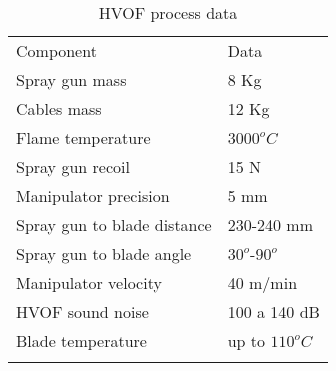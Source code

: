 
\begin{table}
\caption{HVOF process data}
\label{tab::hvof}

\begin{tabular}{ll}
\hline\noalign{\smallskip}
Component & Data \\
\noalign{\smallskip}\hline\noalign{\smallskip}
Spray gun mass & 8 Kg  \\
Cables mass & 12 Kg  \\
Flame temperature & $3000^oC$ \\
Spray gun recoil & 15 N \\
Manipulator precision & 5 mm \\
Spray gun to blade distance & 230-240 mm \\
Spray gun to blade angle & $30^o$-$90^o$ \\
Manipulator velocity & 40 m/min \\
HVOF sound noise & 100 a 140 dB \\ 
Blade temperature & up to $110^oC$ \\
\noalign{\smallskip}\hline
\end{tabular}
\end{table}



